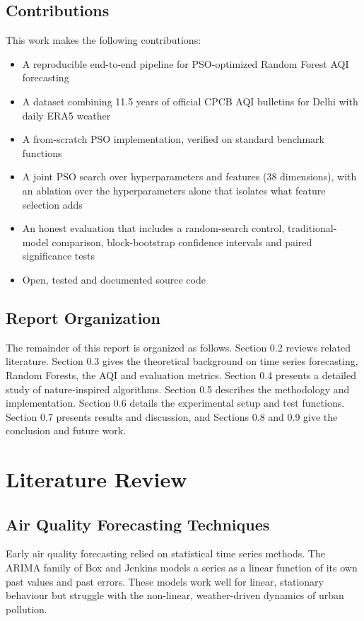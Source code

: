 \subsection{Contributions}
This work makes the following contributions:
\begin{itemize}
\item A reproducible end-to-end pipeline for PSO-optimized Random Forest AQI forecasting
\item A dataset combining 11.5 years of official CPCB AQI bulletins for Delhi with daily ERA5 weather
\item A from-scratch PSO implementation, verified on standard benchmark functions
\item A joint PSO search over hyperparameters and features (38 dimensions), with an ablation over the hyperparameters alone that isolates what feature selection adds
\item An honest evaluation that includes a random-search control, traditional-model comparison, block-bootstrap confidence intervals and paired significance tests
\item Open, tested and documented source code
\end{itemize}

\subsection{Report Organization}
The remainder of this report is organized as follows. Section 0.2 reviews related literature. Section 0.3 gives the theoretical background on time series forecasting, Random Forests, the AQI and evaluation metrics. Section 0.4 presents a detailed study of nature-inspired algorithms. Section 0.5 describes the methodology and implementation. Section 0.6 details the experimental setup and test functions. Section 0.7 presents results and discussion, and Sections 0.8 and 0.9 give the conclusion and future work.

\section{Literature Review}

\subsection{Air Quality Forecasting Techniques}
Early air quality forecasting relied on statistical time series methods. The ARIMA family of Box and Jenkins \cite{boxjenkins} models a series as a linear function of its own past values and past errors. These models work well for linear, stationary behaviour but struggle with the non-linear, weather-driven dynamics of urban pollution.

